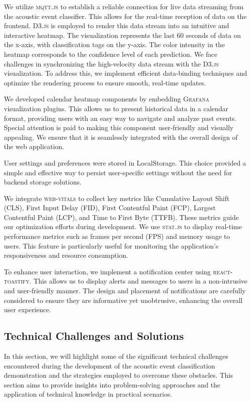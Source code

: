 We utilize \textsc{mqtt.js} to establish a reliable connection for live data streaming from the acoustic event classifier. This allows for the real-time reception of data on the frontend. \textsc{D3.js} is employed to render this data stream into an intuitive and interactive heatmap. The visualization represents the last 60 seconds of data on the x-axis, with classification tags on the y-axis. The color intensity in the heatmap corresponds to the confidence level of each prediction. We face challenges in synchronizing the high-velocity data stream with the \textsc{D3.js} visualization. To address this, we implement efficient data-binding techniques and optimize the rendering process to ensure smooth, real-time updates.

We developed calendar heatmap components by embedding \textsc{Grafana} visualization plugins. This allows us to present historical data in a calendar format, providing users with an easy way to navigate and analyze past events. Special attention is paid to making this component user-friendly and visually appealing. We ensure that it is seamlessly integrated with the overall design of the web application.

User settings and preferences were stored in LocalStorage. This choice provided a simple and effective way to persist user-specific settings without the need for backend storage solutions.

We integrate \textsc{web-vitals} to collect key metrics like Cumulative Layout Shift (CLS), First Input Delay (FID), First Contentful Paint (FCP), Largest Contentful Paint (LCP), and Time to First Byte (TTFB). These metrics guide our optimization efforts during development. We use \textsc{stat.js} to display real-time performance metrics such as frames per second (FPS) and memory usage to users. This feature is particularly useful for monitoring the application's responsiveness and resource consumption.

To enhance user interaction, we implement a notification center using \textsc{react-toastify}. This allows us to display alerts and messages to users in a non-intrusive and user-friendly manner. The design and placement of notifications are carefully considered to ensure they are informative yet unobtrusive, enhancing the overall user experience.

\subsection{Technical Challenges and Solutions}
In this section, we will highlight some of the significant technical challenges encountered during the development of the acoustic event classification demonstration and the strategies employed to overcome these obstacles. This section aims to provide insights into problem-solving approaches and the application of technical knowledge in practical scenarios.


